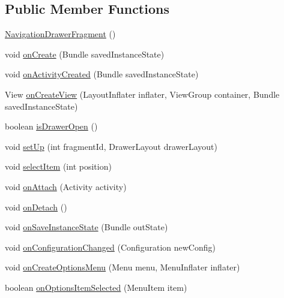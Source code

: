 \subsection*{Public Member Functions}
\begin{DoxyCompactItemize}
\item 
\hyperlink{classcom_1_1qto_1_1ru_1_1vkmessanger_1_1fragments_1_1_navigation_drawer_fragment_ab1617960bb9a4008581846624bea37b5}{Navigation\+Drawer\+Fragment} ()
\item 
void \hyperlink{classcom_1_1qto_1_1ru_1_1vkmessanger_1_1fragments_1_1_navigation_drawer_fragment_af677fcf0f3fab41a937479ac27df2fe1}{on\+Create} (Bundle saved\+Instance\+State)
\item 
void \hyperlink{classcom_1_1qto_1_1ru_1_1vkmessanger_1_1fragments_1_1_navigation_drawer_fragment_a55af2f26427ca7fa950c92f473961316}{on\+Activity\+Created} (Bundle saved\+Instance\+State)
\item 
View \hyperlink{classcom_1_1qto_1_1ru_1_1vkmessanger_1_1fragments_1_1_navigation_drawer_fragment_a4778416f07c90ce82ab7a5efe4113546}{on\+Create\+View} (Layout\+Inflater inflater, View\+Group container, Bundle saved\+Instance\+State)
\item 
boolean \hyperlink{classcom_1_1qto_1_1ru_1_1vkmessanger_1_1fragments_1_1_navigation_drawer_fragment_a90a8db28e0e1c13354de74578ec90e8d}{is\+Drawer\+Open} ()
\item 
void \hyperlink{classcom_1_1qto_1_1ru_1_1vkmessanger_1_1fragments_1_1_navigation_drawer_fragment_ac747c2174965890f124d79c0b595e28d}{set\+Up} (int fragment\+Id, Drawer\+Layout drawer\+Layout)
\item 
void \hyperlink{classcom_1_1qto_1_1ru_1_1vkmessanger_1_1fragments_1_1_navigation_drawer_fragment_a7f220e35c0cbde0f8e90bbfe8a82c000}{select\+Item} (int position)
\item 
void \hyperlink{classcom_1_1qto_1_1ru_1_1vkmessanger_1_1fragments_1_1_navigation_drawer_fragment_adf631c022c7f1617b02cd303def0f485}{on\+Attach} (Activity activity)
\item 
void \hyperlink{classcom_1_1qto_1_1ru_1_1vkmessanger_1_1fragments_1_1_navigation_drawer_fragment_a6d9aeffa4bd72fe2d1431e1504365507}{on\+Detach} ()
\item 
void \hyperlink{classcom_1_1qto_1_1ru_1_1vkmessanger_1_1fragments_1_1_navigation_drawer_fragment_a7aea201fd28996eb6aa0d6d48a6734c0}{on\+Save\+Instance\+State} (Bundle out\+State)
\item 
void \hyperlink{classcom_1_1qto_1_1ru_1_1vkmessanger_1_1fragments_1_1_navigation_drawer_fragment_a645697a8cea2f80b79d485f3eaf003d8}{on\+Configuration\+Changed} (Configuration new\+Config)
\item 
void \hyperlink{classcom_1_1qto_1_1ru_1_1vkmessanger_1_1fragments_1_1_navigation_drawer_fragment_a5a5f42c3121faf36a551339a6aae6a2c}{on\+Create\+Options\+Menu} (Menu menu, Menu\+Inflater inflater)
\item 
boolean \hyperlink{classcom_1_1qto_1_1ru_1_1vkmessanger_1_1fragments_1_1_navigation_drawer_fragment_a57b7fff402fc2eb8f73650ee0ba593f0}{on\+Options\+Item\+Selected} (Menu\+Item item)
\end{DoxyCompactItemize}


